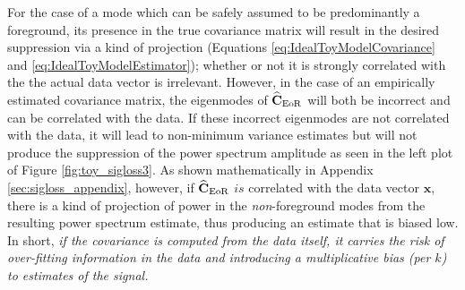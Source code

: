 \documentclass[preprint2,numberedappendix,tighten]{aastex6}  %
\begin{document}
For the case of a mode which can be safely assumed to be predominantly a foreground, its presence in the true covariance matrix will result in the desired suppression via a kind of projection (Equations \ref{eq:IdealToyModelCovariance} and \ref{eq:IdealToyModelEstimator}); whether or not it is strongly correlated with the the actual data vector is irrelevant.  However, in the case of an empirically estimated covariance matrix, the eigenmodes of $\widehat{\textbf{C}}_{\rm EoR}$ will both be incorrect and can be correlated with the data. If these incorrect eigenmodes are not correlated with the data, it will lead to non-minimum variance estimates but will not produce the suppression of the power spectrum amplitude as seen in the left plot of Figure \ref{fig:toy_sigloss3}. As shown mathematically in Appendix \ref{sec:sigloss_appendix}, however, if $\widehat{\mathbf{C}}_{\rm EoR}$ $\textit{is}$ correlated with the data vector $\mathbf{x}$, there is a kind of projection of power in the {\it non}-foreground modes from the resulting power spectrum estimate, thus producing an estimate that is biased low.  In short, {\it if the covariance is computed from the data itself, it carries the risk of over-fitting information in the data and introducing a multiplicative bias (per $k$) to estimates of the signal.} 


%
\end{document}
